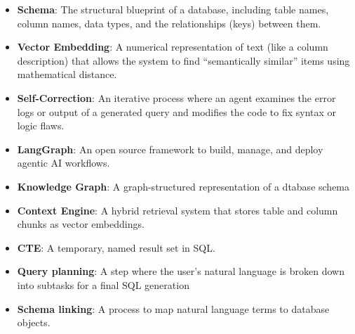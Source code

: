 \begin{itemize}
\item \textbf{Schema}: The structural blueprint of a database, including table names, column names, data types, and the relationships (keys) between them.
\item \textbf{Vector Embedding}: A numerical representation of text (like a column description) that allows the system to find ``semantically similar'' items using mathematical distance.
\item \textbf{Self-Correction}: An iterative process where an agent examines the error logs or output of a generated query and modifies the code to fix syntax or logic flaws.
    \item \textbf{LangGraph}: An open source framework to build, manage, and deploy agentic AI workflows.
    \item \textbf{Knowledge Graph}: A graph-structured representation of a dtabase schema
    \item \textbf{Context Engine}: A hybrid retrieval system that stores table and column chunks as vector embeddings.
    \item \textbf{CTE}: A temporary, named result set in SQL.
    \item \textbf{Query planning}: A step where the user's natural language is broken down into subtasks for a final SQL generation
    \item \textbf{Schema linking}: A process to map natural language terms to database objects.
\end{itemize}
